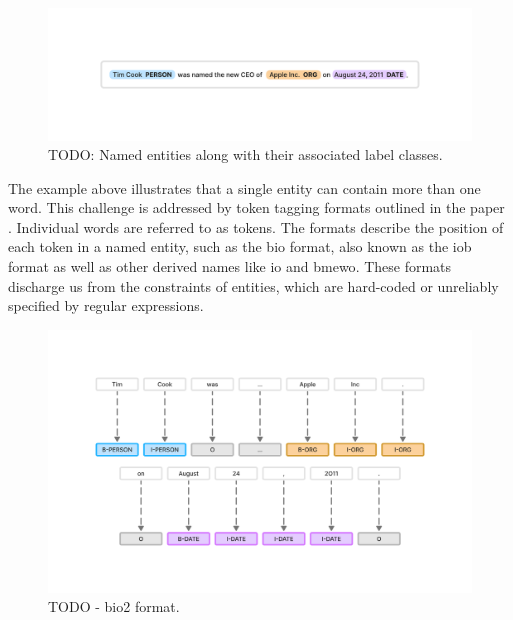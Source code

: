 \begin{figure}[H]
    \centering
    \includegraphics[width=\textwidth]{img/ner-theoretical-example.pdf}
    \caption{TODO: Named entities along with their associated label classes.}
    \label{fig:named-entity-recognition-theoretical-example}
\end{figure}

The example above illustrates that a single entity can contain more than one word. This challenge is addressed by token tagging formats outlined in the paper \parencite{ramshaw-marcus-1995-text}. Individual words are referred to as tokens. The formats describe the position of each token in a named entity, such as the \acrfull{bio} format, also known as the \acrfull{iob} format as well as other derived names like \acrfull{io} and \acrfull{bmewo}. These formats discharge us from the constraints of entities, which are hard-coded or unreliably specified by regular expressions.

\begin{figure}[H]
    \centering
    \includegraphics[width=\textwidth]{img/ner-theoretical-example-tags.pdf}
    \caption{TODO - \acrshort{bio}2 format.}
    \label{fig:named-entity-recognition-theoretical-example-tags}
\end{figure}

